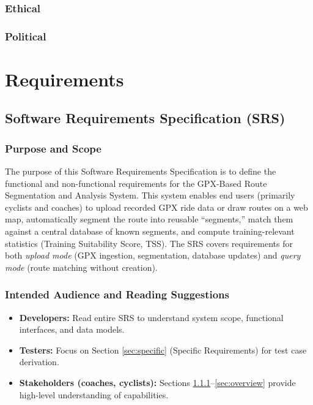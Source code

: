 \documentclass[11pt,twoside]{report}
\begin{document}
\subsection{Ethical}
\subsection{Political}
\label{sec:lsepi}

\chapter{Requirements}
\label{chap:requirements}
\section{Software Requirements Specification (SRS)}
\label{sec:srs}
\subsection{Purpose and Scope}
\label{sec:purpose}
The purpose of this Software Requirements Specification is to define the functional and non-functional requirements
for the GPX-Based Route Segmentation and Analysis System. This system enables end users (primarily cyclists and coaches)
to upload recorded GPX ride data or draw routes on a web map, automatically segment the route into reusable “segments,”
match them against a central database of known segments, and compute training-relevant statistics (Training Suitability Score, TSS).
The SRS covers requirements for both \emph{upload mode} (GPX ingestion, segmentation, database updates) and \emph{query mode}
(route matching without creation).

\subsection{Intended Audience and Reading Suggestions}
\begin{itemize}
	\item \textbf{Developers:} Read entire SRS to understand system scope, functional interfaces, and data models.
	\item \textbf{Testers:} Focus on Section \ref{sec:specific} (Specific Requirements) for test case derivation.
	\item \textbf{Stakeholders (coaches, cyclists):} Sections \ref{sec:purpose}–\ref{sec:overview} provide high-level understanding of capabilities.
\end{itemize}
\end{document}
